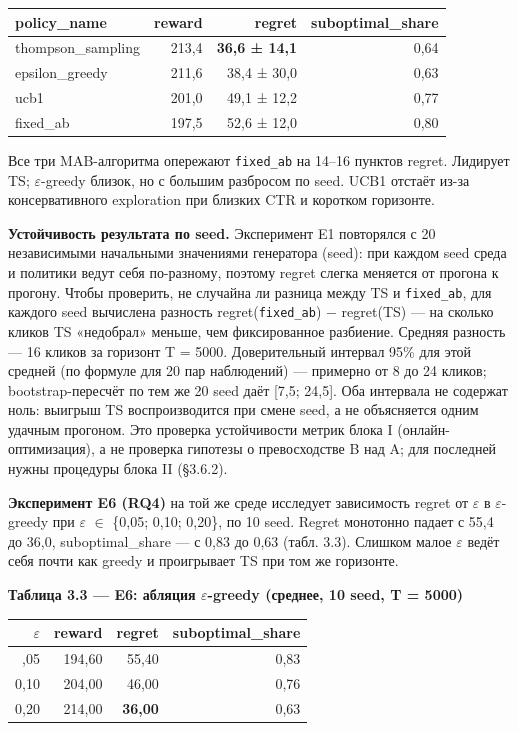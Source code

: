 \begingroup\footnotesize\setlength{\tabcolsep}{4pt}
\begin{xltabular}{\linewidth}{@{}lrrr@{}}
\toprule\noalign{}
policy\_name & reward & regret & suboptimal\_share \\
\midrule\noalign{}
\endhead
\bottomrule\noalign{}
\endlastfoot
thompson\_sampling & 213,4 & \textbf{36,6 ± 14,1} & 0,64 \\
epsilon\_greedy & 211,6 & 38,4 ± 30,0 & 0,63 \\
ucb1 & 201,0 & 49,1 ± 12,2 & 0,77 \\
fixed\_ab & 197,5 & 52,6 ± 12,0 & 0,80 \\
\end{xltabular}
\endgroup

Все три MAB-алгоритма опережают \texttt{fixed\_ab} на 14--16 пунктов regret. Лидирует TS; $\varepsilon$-greedy близок, но с большим разбросом по seed. UCB1 отстаёт из-за консервативного exploration при близких CTR и коротком горизонте.

\textbf{Устойчивость результата по seed.} Эксперимент E1 повторялся с 20 независимыми начальными значениями генератора (seed): при каждом seed среда и политики ведут себя по-разному, поэтому regret слегка меняется от прогона к прогону. Чтобы проверить, не случайна ли разница между TS и \texttt{fixed\_ab}, для каждого seed вычислена разность regret(\texttt{fixed\_ab}) $-$ regret(TS) --- на сколько кликов TS «недобрал» меньше, чем фиксированное разбиение. Средняя разность --- 16 кликов за горизонт T = 5000. Доверительный интервал 95\% для этой средней (по формуле для 20 пар наблюдений) --- примерно от 8 до 24 кликов; bootstrap-пересчёт по тем же 20 seed даёт [7,5; 24,5]. Оба интервала не содержат ноль: выигрыш TS воспроизводится при смене seed, а не объясняется одним удачным прогоном. Это проверка устойчивости метрик блока I (онлайн-оптимизация), а не проверка гипотезы о превосходстве B над A; для последней нужны процедуры блока II (§3.6.2).

\textbf{Эксперимент E6 (RQ4)} на той же среде исследует зависимость regret от $\varepsilon$ в $\varepsilon$-greedy при $\varepsilon$ $\in$ \{0,05; 0,10; 0,20\}, по 10 seed. Regret монотонно падает с 55,4 до 36,0, suboptimal\_share --- с 0,83 до 0,63 (табл. 3.3). Слишком малое $\varepsilon$ ведёт себя почти как greedy и проигрывает TS при том же горизонте.

\textbf{Таблица 3.3 --- E6: абляция $\varepsilon$-greedy (среднее, 10 seed, T = 5000)}

\begingroup\footnotesize\setlength{\tabcolsep}{4pt}
\begin{xltabular}{\linewidth}{@{}rrrr@{}}
\toprule\noalign{}
$\varepsilon$ & reward & regret & suboptimal\_share \\
\midrule\noalign{}
\endhead
\bottomrule\noalign{}
,05 & 194,60 & 55,40 & 0,83 \\
0,10 & 204,00 & 46,00 & 0,76 \\
0,20 & 214,00 & \textbf{36,00} & 0,63 \\
\end{xltabular}
\endgroup

